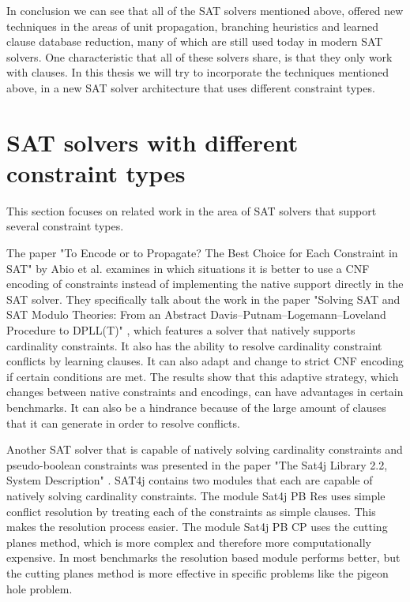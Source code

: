 In conclusion we can see that all of the SAT solvers mentioned above, offered new techniques in the areas of unit propagation, branching heuristics and learned clause database reduction, many of which are still used today in modern SAT solvers. One characteristic that all of these solvers share, is that they only work with clauses. In this thesis we will try to incorporate the techniques mentioned above, in a new SAT solver architecture that uses different constraint types.

\section{SAT solvers with different constraint types}
This section focuses on related work in the area of SAT solvers that support several constraint types.

The paper "To Encode or to Propagate? The Best Choice for Each Constraint in SAT" \cite{abio2013encode} by Abio et al. examines in which situations it is better to use a CNF encoding of constraints instead of implementing the native support directly in the SAT solver. They specifically talk about the work in the paper "Solving SAT and SAT Modulo Theories: From an Abstract
Davis–Putnam–Logemann–Loveland Procedure to DPLL(T)" \cite{nieuwenhuis2006solving}, which features a solver that natively supports cardinality constraints. It also has the ability to resolve cardinality constraint conflicts by learning clauses. It can also adapt and change to strict CNF encoding if certain conditions are met. The results show that this adaptive strategy, which changes between native constraints and encodings, can have advantages in certain benchmarks. It can also be a hindrance because of the large amount of clauses that it can generate in order to resolve conflicts.

Another SAT solver that is capable of natively solving cardinality constraints and pseudo-boolean constraints was presented in the paper "The Sat4j Library 2.2, System Description" \cite{le2010sat4j}. SAT4j contains two modules that each are capable of natively solving cardinality constraints. The module Sat4j PB Res uses simple conflict resolution by treating each of the constraints as simple clauses. This makes the resolution process easier. The module Sat4j PB CP uses the cutting planes method, which is more complex and therefore more computationally expensive. In most benchmarks the resolution based module performs better, but the cutting planes method is more effective in specific problems like the pigeon hole problem.

